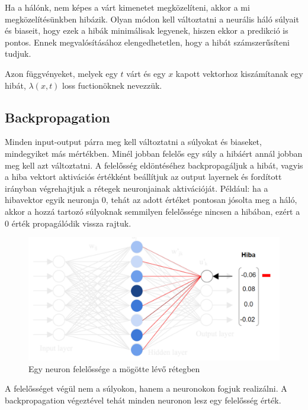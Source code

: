 \documentclass[12pt]{article}
\begin{document}
Ha a hálónk, nem képes a várt kimenetet megközelíteni, akkor a mi megközelítésünkben hibázik. Olyan módon kell változtatni a neurális háló súlyait és biaseit, hogy ezek a hibák minimálisak legyenek, hiszen ekkor a predikció is pontos. Ennek megvalósításához elengedhetetlen, hogy a hibát számszerűsíteni tudjuk.

Azon függvényeket, melyek egy $t$ várt és egy $x$ kapott vektorhoz kiszámítanak egy hibát, $\lambda(x,t)$ loss fuctionöknek nevezzük.

\subsection{Backpropagation}

Minden input-output párra meg kell változtatni a súlyokat és biaseket, mindegyiket más mértékben. Minél jobban felelős egy súly a hibáért annál jobban meg kell azt változtatni. A felelősség eldöntéséhez backpropagáljuk a hibát, vagyis a hiba vektort aktivációs értékként beállítjuk az output layernek és fordított irányban végrehajtjuk a rétegek neuronjainak aktivációját.
Például: ha a hibavektor egyik neuronja 0, tehát az adott értéket pontosan jósolta meg a háló, akkor a hozzá tartozó súlyoknak semmilyen felelőssége nincsen a hibában, ezért a 0 érték propagálódik vissza rajtuk.

\begin{figure}[h!]
  \includegraphics[width=\linewidth]{backprop_single_error.png}
  \caption{Egy neuron felelőssége a mögötte lévő rétegben}
\end{figure}

A felelősséget végül nem a súlyokon, hanem a neuronokon fogjuk realizálni. A backpropagation végeztével tehát minden neuronon lesz egy felelősség érték.
\end{document}
